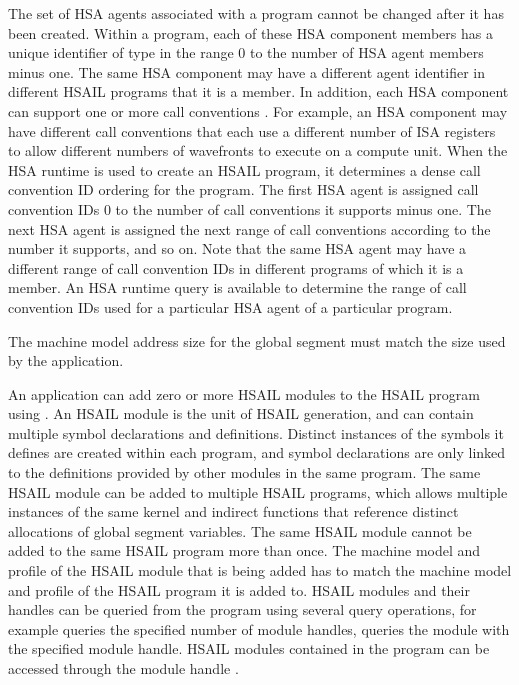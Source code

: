 \documentclass[final,oneside]{book}
\begin{document}
The set of HSA agents associated with a program cannot be changed after it has
been created. Within a program, each of these HSA component members has a unique
identifier of type  in the range 0 to the
number of HSA agent members minus one. The same HSA component may have a
different agent identifier in different HSAIL programs that it is a member. In
addition, each HSA component can support one or more call conventions
. For example, an HSA component
may have different call conventions that each use a different number of ISA
registers to allow different numbers of wavefronts to execute on a compute unit.
When the HSA runtime is used to create an HSAIL program, it determines a dense
call convention ID ordering for the program. The first HSA agent is assigned
call convention IDs 0 to the number of call conventions it supports minus one.
The next HSA agent is assigned the next range of call conventions according to
the number it supports, and so on. Note that the same HSA agent may have a
different range of call convention IDs in different programs of which it is a
member. An HSA runtime query  is available
to determine the range of call convention IDs used for a particular HSA agent of
a particular program.

The machine model address size for the global segment must match the size used
by the application.

An application can add zero or more HSAIL modules 
to the HSAIL program using . An HSAIL module is the
unit of HSAIL generation, and can contain multiple symbol declarations and
definitions. Distinct instances of the symbols it defines are created within
each program, and symbol declarations are only linked to the definitions
provided by other modules in the same program. The same HSAIL module can be
added to multiple HSAIL programs, which allows multiple instances of the same
kernel and indirect functions that reference distinct allocations of global
segment variables.  The same HSAIL module cannot be added to the same HSAIL
program more than once. The machine model and profile of the HSAIL module that
is being added has to match the machine model and profile of the HSAIL program
it is added to. HSAIL modules and their handles can be queried from the program
using several query operations, for example
 queries the specified number of module
handles,  queries the module with the
specified module handle. HSAIL modules contained in the program can be accessed
through the module handle .
\end{document}
